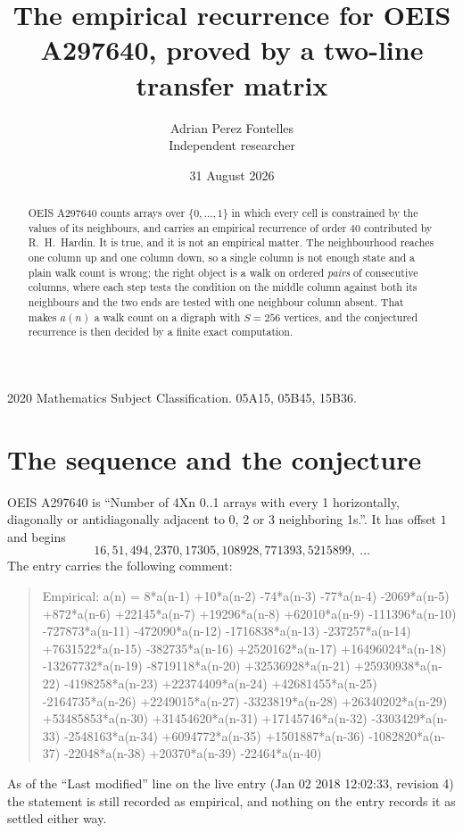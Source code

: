 \documentclass[11pt,a4paper]{article}
\title{The empirical recurrence for OEIS A297640, proved by a two-line transfer matrix}
\author{Adrian Perez Fontelles\\ \small Independent researcher}
\date{31 August 2026}
\theoremstyle{plain}
\theoremstyle{definition}
\begin{document}
\maketitle

\begin{abstract}
OEIS A297640 counts arrays over $\{0,\dots,1\}$ in which every cell is constrained by the
values of its neighbours, and carries an empirical recurrence of order $40$ contributed
by R.~H.~Hardin. It is true, and it is not an empirical matter. The neighbourhood reaches one
column up and one column down, so a single column is not enough state and a plain walk count
is wrong; the right object is a walk on ordered \emph{pairs} of consecutive columns, where
each step tests the condition on the middle column against both its neighbours and the two
ends are tested with one neighbour column absent. That makes $a(n)$ a walk count on a digraph
with $S=256$ vertices, and the conjectured recurrence is then decided by a finite exact
computation.
\end{abstract}

\noindent\small 2020 Mathematics Subject Classification. 05A15, 05B45, 15B36.\normalsize

\section{The sequence and the conjecture}

OEIS A297640 is ``Number of 4Xn 0..1 arrays with every 1 horizontally, diagonally or antidiagonally adjacent to 0, 2 or 3 neighboring 1s.''. It has offset $1$ and begins
\[
16, 51, 494, 2370, 17305, 108928, 771393, 5215899,\ \dots
\]
The entry carries the following comment:
\begin{quote}\small
Empirical: a(n) = 8*a(n-1) +10*a(n-2) -74*a(n-3) -77*a(n-4) -2069*a(n-5) +872*a(n-6) +22145*a(n-7) +19296*a(n-8) +62010*a(n-9) -111396*a(n-10) -727873*a(n-11) -472090*a(n-12) -1716838*a(n-13) -237257*a(n-14) +7631522*a(n-15) -382735*a(n-16) +2520162*a(n-17) +16496024*a(n-18) -13267732*a(n-19) -8719118*a(n-20) +32536928*a(n-21) +25930938*a(n-22) -4198258*a(n-23) +22374409*a(n-24) +42681455*a(n-25) -2164735*a(n-26) +2249015*a(n-27) -3323819*a(n-28) +26340202*a(n-29) +53485853*a(n-30) +31454620*a(n-31) +17145746*a(n-32) -3303429*a(n-33) -2548163*a(n-34) +6094772*a(n-35) +1501887*a(n-36) -1082820*a(n-37) -22048*a(n-38) +20370*a(n-39) -22464*a(n-40)
\end{quote}
As of the ``Last modified'' line on the live entry (Jan 02 2018 12:02:33, revision 4) the statement is
still recorded as empirical, and nothing on the entry records it as settled either way.
\end{document}
